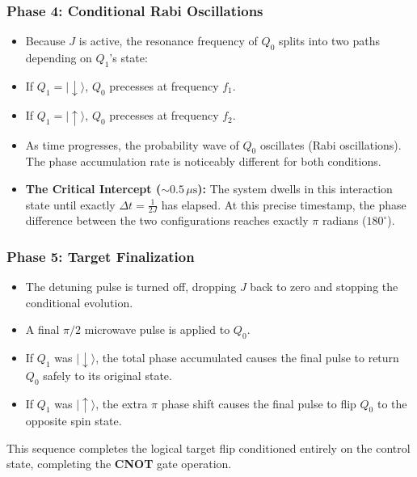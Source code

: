 \documentclass[
]{article}
\providecommand{\tightlist}{%
  \setlength{\itemsep}{0pt}\setlength{\parskip}{0pt}}
\begin{document}
\subsubsection{Phase 4: Conditional Rabi
Oscillations}\label{phase-4-conditional-rabi-oscillations}

\begin{itemize}
\item
  Because \(J\) is active, the resonance frequency of \(Q_0\) splits
  into two paths depending on \(Q_1\)'s state:
\item
  If \(Q_1 = |\downarrow\rangle\), \(Q_0\) precesses at frequency
  \(f_1\).
\item
  If \(Q_1 = |\uparrow\rangle\), \(Q_0\) precesses at frequency \(f_2\).
\item
  As time progresses, the probability wave of \(Q_0\) oscillates (Rabi
  oscillations). The phase accumulation rate is noticeably different for
  both conditions.
\item
  \textbf{The Critical Intercept (\(\sim 0.5\,\mu\text{s}\)):} The
  system dwells in this interaction state until exactly
  \(\Delta t = \frac{1}{2J}\) has elapsed. At this precise timestamp,
  the phase difference between the two configurations reaches exactly
  \(\pi\) radians (\(180^\circ\)).
\end{itemize}

\subsubsection{Phase 5: Target
Finalization}\label{phase-5-target-finalization}

\begin{itemize}
\tightlist
\item
  The detuning pulse is turned off, dropping \(J\) back to zero and
  stopping the conditional evolution.
\item
  A final \(\pi/2\) microwave pulse is applied to \(Q_0\).
\item
  If \(Q_1\) was \(|\downarrow\rangle\), the total phase accumulated
  causes the final pulse to return \(Q_0\) safely to its original state.
\item
  If \(Q_1\) was \(|\uparrow\rangle\), the extra \(\pi\) phase shift
  causes the final pulse to flip \(Q_0\) to the opposite spin state.
\end{itemize}

This sequence completes the logical target flip conditioned entirely on
the control state, completing the \textbf{CNOT} gate operation.
\end{document}
